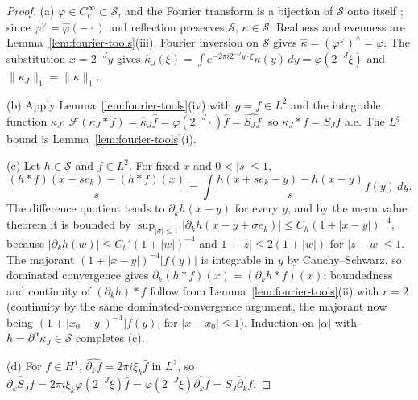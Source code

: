 \documentclass[11pt]{article}
\theoremstyle{definition}
\theoremstyle{plain}
\newcommand{\norm}[1]{\lVert #1\rVert}
\begin{document}
\begin{proof}
(a) $\varphi\in C_c^\infty\subset\mathcal S$, and the Fourier transform is a
bijection of $\mathcal S$ onto itself \cite[Cor.~2.2.15]{Grafakos2014};
since $\varphi^\vee=\hat\varphi(-\cdot)$ and reflection preserves $\mathcal S$,
$\kappa\in\mathcal S$.  Realness and evenness are
Lemma~\ref{lem:fourier-tools}(iii).  Fourier inversion on $\mathcal S$
\cite[Thm.~2.2.14(2)]{Grafakos2014} gives $\hat\kappa=(\varphi^\vee)^\wedge=\varphi$.
The substitution $x=2^{-J}y$ gives
$\hat\kappa_J(\xi)=\int e^{-2\pi i2^{-J}y\cdot\xi}\kappa(y)\,dy=\varphi(2^{-J}\xi)$
and $\norm{\kappa_J}_1=\norm\kappa_1$.

(b) Apply Lemma~\ref{lem:fourier-tools}(iv) with $g=f\in L^2$ and the
integrable function $\kappa_J$: $\mathcal F(\kappa_J*f)=\hat\kappa_J\hat f
=\varphi(2^{-J}\cdot)\hat f=\widehat{S_Jf}$, so $\kappa_J*f=S_Jf$ a.e.  The
$L^q$ bound is Lemma~\ref{lem:fourier-tools}(i).

(c) Let $h\in\mathcal S$ and $f\in L^2$.  For fixed $x$ and $0<|s|\le1$,
\[
 \frac{(h*f)(x+se_k)-(h*f)(x)}{s}
 =\int\frac{h(x+se_k-y)-h(x-y)}{s}f(y)\,dy .
\]
The difference quotient tends to $\partial_kh(x-y)$ for every $y$, and by
the mean value theorem it is bounded by
$\sup_{|\sigma|\le1}|\partial_kh(x-y+\sigma e_k)|\le C_h(1+|x-y|)^{-4}$,
because $|\partial_kh(w)|\le C_h'(1+|w|)^{-4}$ and $1+|z|\le2(1+|w|)$ for
$|z-w|\le1$.  The majorant $(1+|x-y|)^{-4}|f(y)|$ is integrable in $y$ by
Cauchy--Schwarz, so dominated convergence gives
$\partial_k(h*f)(x)=(\partial_kh*f)(x)$; boundedness and continuity of
$(\partial_kh)*f$ follow from Lemma~\ref{lem:fourier-tools}(ii) with
$r=2$ (continuity by the same dominated-convergence argument, the
majorant now being $(1+|x_0-y|)^{-4}|f(y)|$ for $|x-x_0|\le1$).  Induction
on $|\alpha|$ with $h=\partial^\alpha\kappa_J\in\mathcal S$ completes (c).

(d) For $f\in H^1$, $\widehat{\partial_kf}=2\pi i\xi_k\hat f$ in $L^2$, so
$\widehat{\partial_kS_Jf}=2\pi i\xi_k\varphi(2^{-J}\xi)\hat f
=\varphi(2^{-J}\xi)\widehat{\partial_kf}=\widehat{S_J\partial_kf}$.
\end{proof}
\end{document}
